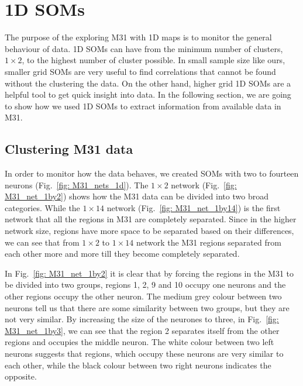 \section{1D SOMs}
    The purpose of the exploring M31 with 1D maps is to monitor the general behaviour of data. 
    1D SOMs can have from the minimum number of clusters, $1\times2$, to the highest number of cluster possible.
    In small sample size like ours, smaller grid SOMs are very useful to find correlations that cannot be found without the clustering the data.
    On the other hand, higher grid 1D SOMs are a helpful tool to get quick insight into data.
    In the following section, we are going to show how we used 1D SOMs to extract information from available data in M31. %

    \subsection{Clustering M31 data}
    \label{Sec: 1d_cluster}
        In order to monitor how the data behaves, we created SOMs with two to fourteen neurons (Fig.~\ref{fig: M31_nets_1d}).
        The $1\times2$ network (Fig.~\ref{fig: M31_net_1by2}) shows how the M31 data can be divided into two broad categories.
        While the $1\times14$ network (Fig.~\ref{fig: M31_net_1by14}) is the first network that all the regions in M31 are completely separated.
        Since in the higher network size, regions have more space to be separated based on their differences, we can see that from $1\times2$ to $1\times14$ network the M31 regions separated from each other more and more till they become completely separated. %
        
        In Fig.~\ref{fig: M31_net_1by2} it is clear that by forcing the regions in the M31 to be divided into two groups, regions 1, 2, 9 and 10 occupy one neurons and the other regions occupy the other neuron.
        The medium grey colour between two neurons tell us that there are some similarity between two groups, but they are not very similar. 
        By increasing the size of the neurones to three, in Fig.~\ref{fig: M31_net_1by3}, we can see that the region 2 separates itself from the other regions and occupies the middle neuron.
        The white colour between two left neurons suggests that regions, which occupy these neurons are very similar to each other, while the black colour between two right neurons indicates the opposite.
        
